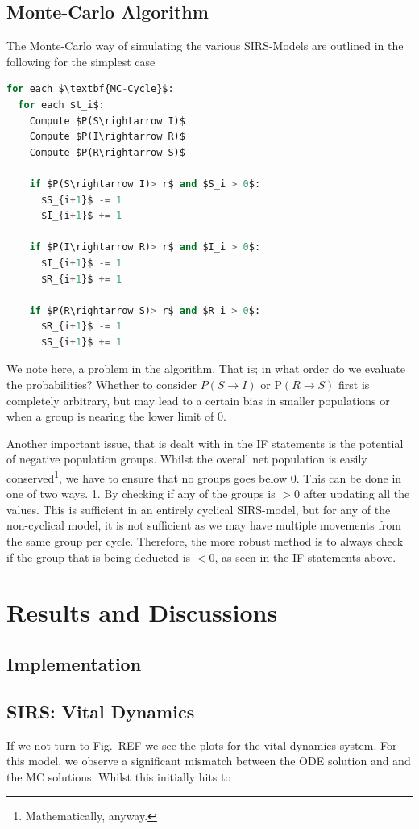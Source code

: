 \documentclass[10pt,showpacs,preprintnumbers,amsmath,amssymb,nofootinbib,aps,prl,twocolumn,groupedaddress,superscriptaddress,showkeys]{revtex4-1}
\begin{document}
  \subsection{Monte-Carlo Algorithm}

  The Monte-Carlo way of simulating the various SIRS-Models are outlined in the following
  for the simplest case
\begin{lstlisting}[mathescape=true, language=python, title=SIRS Monte-Carlo]
for each $\textbf{MC-Cycle}$:
  for each $t_i$:
    Compute $P(S\rightarrow I)$
    Compute $P(I\rightarrow R)$
    Compute $P(R\rightarrow S)$

    if $P(S\rightarrow I)> r$ and $S_i > 0$:
      $S_{i+1}$ -= 1
      $I_{i+1}$ += 1

    if $P(I\rightarrow R)> r$ and $I_i > 0$:
      $I_{i+1}$ -= 1
      $R_{i+1}$ += 1

    if $P(R\rightarrow S)> r$ and $R_i > 0$:
      $R_{i+1}$ -= 1
      $S_{i+1}$ += 1
\end{lstlisting}
  
  We note here, a problem in the algorithm. That is; in what order do we evaluate the probabilities?
  Whether to consider $P(S\rightarrow I)$ or P$(R\rightarrow S)$ first is completely arbitrary, but may lead to a certain bias in smaller populations or when a group is nearing the lower limit of 0.

  Another important issue, that is dealt with in the IF statements is the potential of negative population groups. Whilst the overall net population is easily conserved\footnote{Mathematically, anyway.}, we have to ensure that no groups goes below 0. This can be done in one of two ways. 1. By checking if any of the groups is $>0$ after updating all the values. This is sufficient in an entirely cyclical SIRS-model, but for any of the non-cyclical model, it is not sufficient as we may have multiple movements from the same group per cycle. Therefore, the more robust method is to always check if the group that is being deducted is $<0$, as seen in the IF statements above.
  

\section{Results and Discussions}
  \subsection{Implementation}

  \subsection{SIRS: Vital Dynamics}
    If we not turn to Fig.~REF we see the plots for the vital dynamics system.
    For this model, we observe a significant mismatch between the ODE solution and
    and the MC solutions. Whilst this initially hits to 
    
\end{document}
